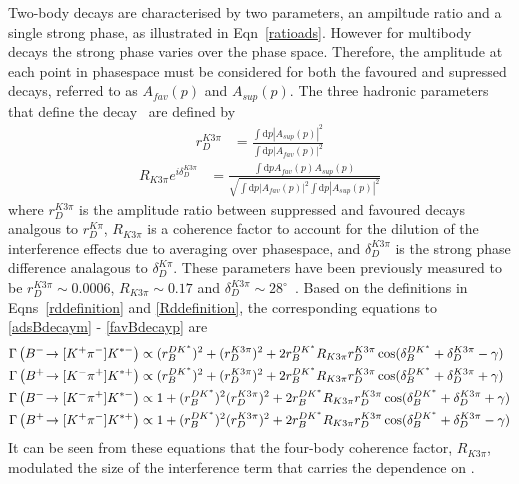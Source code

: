 Two-body \decay{\D}{\Kmp\pipm} decays are characterised by two parameters, an ampiltude ratio and a single strong phase, as illustrated in Eqn~\ref{ratioads}. However for multibody \decay{\D}{\Kmp\pipm\pimp\pipm} decays the strong phase varies over the phase space. Therefore, the amplitude at each point in phasespace must be considered for both the \decay{\D}{\Km\pip\pim\pip} favoured and \decay{\Dz}{\Kp\pim\pip\pim} supressed decays, referred to as $A_{fav}(p)$ and $A_{sup}(p)$. The three hadronic parameters that define the  \decay{\D}{\Km\pip\pim\pip} decay~\cite{charmk3pi,LHCb-PAPER-2015-057} are defined by
\begin{align}
r_D^{K3\pi} &= \frac{\int \mathrm{d}p \left|A_{sup}(p)\right|^2}{\int \mathrm{d}p \left|A_{fav}(p)\right|^2}
\label{rddefinition}
\end{align}
\begin{align}
R_{K3\pi} e^{i\delta_D^{K3\pi}} &= \frac{\int \mathrm{d}p A_{fav}(p)A_{sup}(p)}{\sqrt{\int \mathrm{d}p \left|A_{fav}(p)\right|^2 \int \mathrm{d}p \left|A_{sup}(p)\right|^2}}
\label{Rddefinition}
\end{align}
where $r_D^{K3\pi}$ is the amplitude ratio between suppressed and favoured \decay{\D}{\Km\pip\pim\pip} decays analgous to $r_D^{K\pi}$, $R_{K3\pi}$ is a coherence factor to account for the dilution of the interference effects due to averaging over phasespace, and $\delta_D^{K3\pi}$ is the strong phase difference analagous to $\delta_D^{K\pi}$. These parameters have been previously measured to be $r_D^{K3\pi} \sim 0.0006$, $R_{K3\pi} \sim 0.17$ and $\delta_D^{K3\pi} \sim 28^{\circ}$~\cite{charmk3pi,LHCb-PAPER-2015-057}. Based on the definitions in Eqns~\ref{rddefinition} and \ref{Rddefinition}, the corresponding equations to \eqn\ref{adsBdecaym} - \ref{favBdecayp} are
\begin{align}
\Gamma\left({{{B}^-}}\!\rightarrow [{{K}^+}{{\pi}^-}]{\ensuremath{{K}^{*-}}}\right) &\propto (r_B^{DK^*})^2 + (r_D^{K3\pi})^2 + 2r_B^{DK^*}R_{K3\pi}r_D^{K3\pi}\cos(\delta_B^{DK^*} + \delta_D^{K3\pi} - \gamma) \label{adsBdecaym4body} \\
\Gamma\left({{{B}^+}}\!\rightarrow [{{K}^-}{{\pi}^+}]{\ensuremath{{K}^{*+}}}\right) &\propto (r_B^{DK^*})^2 + (r_D^{K3\pi})^2 + 2r_B^{DK^*}R_{K3\pi}r_D^{K3\pi}\cos(\delta_B^{DK^*} + \delta_D^{K3\pi} + \gamma) \label{adsBdecayp4body} \\
\Gamma\left({{{B}^-}}\!\rightarrow [{{K}^-}{{\pi}^+}]{\ensuremath{{K}^{*-}}}\right) &\propto 1 + (r_B^{DK^*})^2(r_D^{K3\pi})^2 + 2r_B^{DK^*}R_{K3\pi}r_D^{K3\pi}\cos(\delta_B^{DK^*} + \delta_D^{K3\pi} + \gamma) \label{favBdecaym4body} \\
\Gamma\left({{{B}^+}}\!\rightarrow [{{K}^+}{{\pi}^-}]{\ensuremath{{K}^{*+}}}\right) &\propto 1 + (r_B^{DK^*})^2(r_D^{K3\pi})^2 + 2r_B^{DK^*}R_{K3\pi}r_D^{K3\pi}\cos(\delta_B^{DK^*} + \delta_D^{K3\pi} - \gamma) \label{favBdecayp4body} 
\end{align}
It can be seen from these equations that the four-body coherence factor, $R_{K3\pi}$, modulated the size of the interference term that carries the dependence on \Pgamma.

